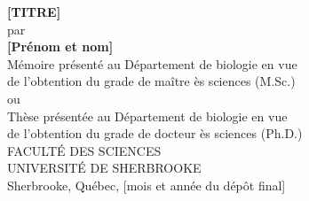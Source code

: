 \documentclass[12pt,oneside]{book}
\newcommand{\blankpage}{	%
\newpage
\thispagestyle{empty}
\mbox{}
\newpage
}
\begin{document}
\blankpage
\blankpage


\renewcommand{\figurename}{Figure}
\renewcommand{\tablename}{Table} 		%
\renewcommand{\chaptername}{CHAPITRE} 
\renewcommand{\contentsname}{TABLE DES MATIÈRES}
\renewcommand{\listtablename}{LISTE DES TABLEAUX}
\renewcommand{\listfigurename}{LISTE DES FIGURES}



\thispagestyle{empty}
\singlespacing
\begin{center}
{
{\textbf{[TITRE]}} %
\\  \vspace{2.5cm}
par
\\   \vspace{2.5cm}
{\textbf{[Prénom et nom]}} %
\\   \vspace{2.5cm}
Mémoire présenté au Département de biologie en vue\\
de l'obtention du grade de maître ès sciences (M.Sc.)\\
ou\\
Thèse présentée au Département de biologie en vue\\
de l'obtention du grade de docteur ès sciences (Ph.D.)\\
\vfill
FACULTÉ DES SCIENCES\\
UNIVERSITÉ DE SHERBROOKE\\  \vspace{1.5cm}
\vfill
Sherbrooke, Québec, [mois et année du dépôt final]
}

\end{center}


\end{document}
